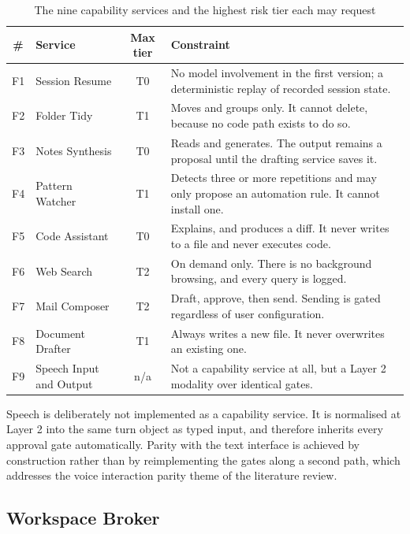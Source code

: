 \documentclass[11pt]{article}
\begin{document}
\begin{table}[htbp]
\centering
\small
\caption{The nine capability services and the highest risk tier each may request}
\label{tab:services}
\begin{tabular}{@{}clcp{}@{}}
\toprule
\textbf{\#} & \textbf{Service} & \textbf{Max tier} & \textbf{Constraint} \\
\midrule
F1 & Session Resume & T0 & No model involvement in the first version; a deterministic replay of recorded session state. \\
F2 & Folder Tidy & T1 & Moves and groups only. It cannot delete, because no code path exists to do so. \\
F3 & Notes Synthesis & T0 & Reads and generates. The output remains a proposal until the drafting service saves it. \\
F4 & Pattern Watcher & T1 & Detects three or more repetitions and may only propose an automation rule. It cannot install one. \\
F5 & Code Assistant & T0 & Explains, and produces a diff. It never writes to a file and never executes code. \\
F6 & Web Search & T2 & On demand only. There is no background browsing, and every query is logged. \\
F7 & Mail Composer & T2 & Draft, approve, then send. Sending is gated regardless of user configuration. \\
F8 & Document Drafter & T1 & Always writes a new file. It never overwrites an existing one. \\
F9 & Speech Input and Output & n/a & Not a capability service at all, but a Layer 2 modality over identical gates. \\
\bottomrule
\end{tabular}
\end{table}

\begin{finding}
Speech is deliberately not implemented as a capability service. It is normalised at
Layer 2 into the same turn object as typed input, and therefore inherits every approval
gate automatically. Parity with the text interface is achieved by construction rather
than by reimplementing the gates along a second path, which addresses the voice
interaction parity theme of the literature review.
\end{finding}

\subsection{Workspace Broker}
\label{sec:broker}
\end{document}
